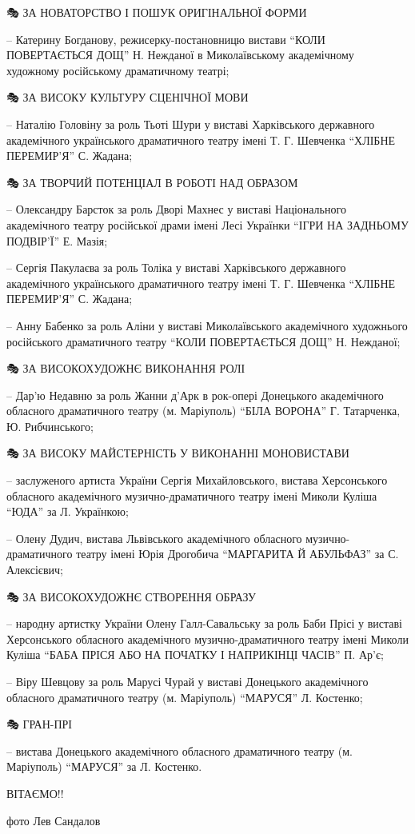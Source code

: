 🎭 ЗА НОВАТОРСТВО І ПОШУК ОРИГІНАЛЬНОЇ ФОРМИ

– Катерину Богданову, режисерку-постановницю вистави \enquote{КОЛИ ПОВЕРТАЄТЬСЯ ДОЩ}
Н. Нежданої в Миколаївському академічному художному російському драматичному
театрі;

🎭 ЗА ВИСОКУ КУЛЬТУРУ СЦЕНІЧНОЇ МОВИ

– Наталію Головіну за роль Тьоті Шури у виставі Харківського державного
академічного українського драматичного театру імені Т. Г. Шевченка \enquote{ХЛІБНЕ
ПЕРЕМИР'Я} С. Жадана;

🎭 ЗА ТВОРЧИЙ ПОТЕНЦІАЛ В РОБОТІ НАД ОБРАЗОМ

– Олександру Барсток за роль Дворі Махнес у виставі Національного академічного
театру російської драми імені Лесі Українки \enquote{ІГРИ НА ЗАДНЬОМУ ПОДВІР'Ї} Е.
Мазія;

– Сергія Пакулаєва за роль Толіка у виставі Харківського державного
академічного українського драматичного театру імені Т. Г. Шевченка \enquote{ХЛІБНЕ
ПЕРЕМИР'Я} С. Жадана;

– Анну Бабенко за роль Аліни у виставі Миколаївського академічного художнього
російського драматичного театру \enquote{КОЛИ ПОВЕРТАЄТЬСЯ ДОЩ} Н. Нежданої;

🎭 ЗА ВИСОКОХУДОЖНЄ ВИКОНАННЯ РОЛІ 

– Дар'ю Недавню за роль Жанни д'Арк в рок-опері Донецького академічного
обласного драматичного театру (м. Маріуполь) \enquote{БІЛА ВОРОНА} Г. Татарченка, Ю.
Рибчинського; 

🎭 ЗА ВИСОКУ МАЙСТЕРНІСТЬ У ВИКОНАННІ МОНОВИСТАВИ

– заслуженого артиста України Сергія Михайловського, вистава  Херсонського
обласного академічного музично-драматичного театру імені Миколи Куліша \enquote{ЮДА} за
Л. Українкою;

– Олену Дудич, вистава Львівського академічного обласного музично-драматичного
театру імені Юрія Дрогобича \enquote{МАРГАРИТА Й АБУЛЬФАЗ} за С. Алексієвич;

🎭 ЗА ВИСОКОХУДОЖНЄ СТВОРЕННЯ ОБРАЗУ

– народну артистку України Олену Галл-Савальську за роль Баби Прісі у виставі
Херсонського обласного академічного музично-драматичного театру імені Миколи
Куліша \enquote{БАБА ПРІСЯ АБО НА ПОЧАТКУ І НАПРИКІНЦІ ЧАСІВ} П. Ар'є;

– Віру Шевцову за роль Марусі Чурай у виставі Донецького академічного обласного
драматичного театру (м. Маріуполь) \enquote{МАРУСЯ} Л. Костенко;

🎭 ГРАН-ПРІ 

– вистава Донецького академічного обласного драматичного театру (м. Маріуполь)
\enquote{МАРУСЯ} за Л. Костенко. 

ВІТАЄМО!!🥳💐🎉🤩

фото Лев Сандалов
